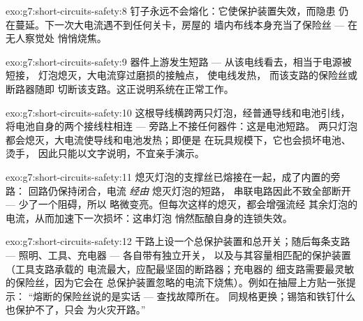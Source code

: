\begin{solution}{exo:g7:short-circuits-safety:8}
钉子永远不会熔化：它使保护装置失效，而隐患
仍在蔓延。下一次大电流遇不到任何关卡，房屋的
墙内布线本身充当了保险丝 --- 在无人察觉处
悄悄烧焦。
\end{solution}

\begin{solution}{exo:g7:short-circuits-safety:9}
器件上游发生短路 --- 从该电线看去，相当于电源被短接，
灯泡熄灭，大电流穿过磨损的接触点，
使电线发热，
而该支路的保险丝或断路器随即
切断该支路。这正说明系统在正常工作。
\end{solution}

\begin{solution}{exo:g7:short-circuits-safety:10}
这根导线横跨两只灯泡，经普通导线和电池引线，
将电池自身的两个接线柱相连 ---
旁路上不接任何器件：这是电池短路。
两只灯泡都会熄灭，大电流使导线和电池发热；即便是
在玩具规模下，它也会损坏电池、烫手，
因此只能以文字说明，不宜亲手演示。
\end{solution}

\begin{solution}{exo:g7:short-circuits-safety:11}
熄灭灯泡的支撑丝已熔接在一起，成了内置的旁路：
回路仍保持闭合，电流 \emph{经由} 熄灭灯泡的短路，
串联电路因此不致全部断开 --- 少了一个阻碍，所以
略微变亮。但每次这样的熄灭，都会增强流经
其余灯泡的电流，从而加速下一次损坏：这串灯泡
悄然酝酿自身的连锁失效。
\end{solution}

\begin{solution}{exo:g7:short-circuits-safety:12}
干路上设一个总保护装置和总开关；随后每条支路
--- 照明、工具、充电器 --- 各自带有独立开关，
以及与其容量相匹配的保护装置（工具支路承载的
电流最大，应配最坚固的断路器；充电器的
细支路需要最灵敏的保险丝，因为它会在
总保护装置忽略的电流下烧焦）。例如在抽屉上方贴一张提示：
“熔断的保险丝说的是实话 --- 查找故障所在。
同规格更换；锡箔和铁钉什么也保护不了，只会
为火灾开路。”
\end{solution}

